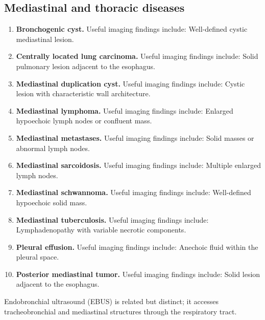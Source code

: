 \subsection{Mediastinal and thoracic diseases}
\begin{enumerate}[leftmargin=*,itemsep=0.45em,topsep=0.4em]
\item \textbf{Bronchogenic cyst.} Useful imaging findings include: Well-defined cystic mediastinal lesion.
\item \textbf{Centrally located lung carcinoma.} Useful imaging findings include: Solid pulmonary lesion adjacent to the esophagus.
\item \textbf{Mediastinal duplication cyst.} Useful imaging findings include: Cystic lesion with characteristic wall architecture.
\item \textbf{Mediastinal lymphoma.} Useful imaging findings include: Enlarged hypoechoic lymph nodes or confluent mass.
\item \textbf{Mediastinal metastases.} Useful imaging findings include: Solid masses or abnormal lymph nodes.
\item \textbf{Mediastinal sarcoidosis.} Useful imaging findings include: Multiple enlarged lymph nodes.
\item \textbf{Mediastinal schwannoma.} Useful imaging findings include: Well-defined hypoechoic solid mass.
\item \textbf{Mediastinal tuberculosis.} Useful imaging findings include: Lymphadenopathy with variable necrotic components.
\item \textbf{Pleural effusion.} Useful imaging findings include: Anechoic fluid within the pleural space.
\item \textbf{Posterior mediastinal tumor.} Useful imaging findings include: Solid lesion adjacent to the esophagus.
\end{enumerate}
Endobronchial ultrasound (EBUS) is related but distinct; it accesses tracheobronchial and mediastinal structures through the respiratory tract.

